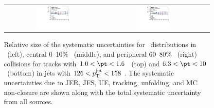 \begin{figure}
{\begin{tabular}{ccc}
\includegraphics[width=0.36\textwidth]{figures/systematics/ChPS_dR_sys_PbPb_error_trk6_jet7_cent0} &
\includegraphics[width=0.36\textwidth]{figures/systematics/ChPS_dR_sys_PbPb_error_trk6_jet7_cent5} \\
\end{tabular}}
\caption{
Relative size of the systematic uncertainties for \Dptr\ distributions in \pp\ (left), central 0--10\% \pbpb\ (middle), and peripheral 60--80\% \pbpb\ (right) collisions for tracks with $1.0 < \pt < 1.6$ \GeV\ (top) and $6.3 < \pt < 10$ \GeV\ (bottom) in jets with $126 < \mbox{$p_{\mathrm{T}}^{\mathrm{jet}}$} < 158$ \GeV. The systematic uncertainties due to JER, JES, UE, tracking, unfolding, and MC non-closure are shown along with the total systematic uncertainty from all sources.
}
\label{fig:Systematics_Dpt}
\end{figure}


